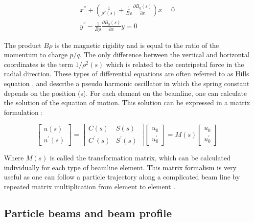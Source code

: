 \begin{equation}
    \begin{aligned}
        x^{''} + \left(\frac{1}{\rho^{2}(s)}+\frac{1}{B\rho}\frac{\partial B_y(s)}{\partial x} \right)  x = 0 \\
        y^{''} - \frac{1}{B \rho}\frac{\partial B_y (s)}{\partial x}  y = 0
    \end{aligned}
    \label{eq:EqMotion}
\end{equation}

The product $B \rho$ is the magnetic rigidity and is equal to the ratio of the momentum to charge $p/q$. The only difference between the vertical and horizontal coordinates is the term $1/\rho^2(s)$ which is related to the centripetal force in the radial direction. These types of differential equations are often referred to as Hills equation \parencite*[][]{ref:HillEquation}, and describe a pseudo harmonic oscillator in which the spring constant depends on the position (s). For each element on the beamline, one can calculate the solution of the equation of motion. This solution can be expressed in a matrix formulation \parencite*[][]{ref:MatrixForm}:

\begin{equation}
    \begin{bmatrix}
        u(s) \\ u^{'}(s) 
   \end{bmatrix}
   = 
   \begin{bmatrix}
        C(s) & S(s) \\ C^{'}(s)  & S^{'}(s)
   \end{bmatrix}
   \begin{bmatrix}
        u_0 \\ u^{'}_0
   \end{bmatrix}
   =
   M(s) 
   \begin{bmatrix}
        u_0 \\ u^{'}_0
   \end{bmatrix}
\end{equation}

Where $M(s)$ is called the transformation matrix, which can be calculated individually for each type of beamline element. This matrix formalism is very useful as one can follow a particle trajectory along a complicated beam line by repeated matrix multiplication from element to element \parencite*[][]{ref:MatrixTransport}.

\subsection{Particle beams and beam profile}
\label{subsec:TransBeamProf}

